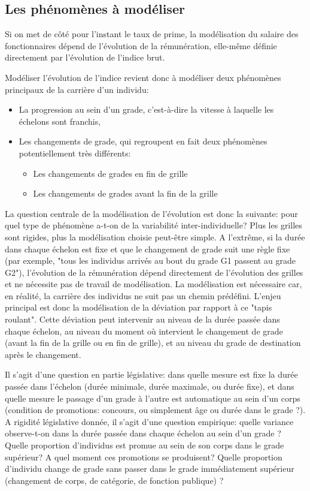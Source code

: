 \documentclass[11pt,a4paper]{article}
\begin{document}
\subsection*{Les phénomènes à modéliser}

Si on met de côté pour l'instant le taux de prime, la modélisation du salaire des fonctionnaires dépend de l'évolution de la rémunération, elle-même définie directement par l'évolution de l'indice brut. 

Modéliser l'évolution de l'indice revient donc à modéliser deux phénomènes principaux de la carrière d'un individu: 
\begin{itemize}[leftmargin=1cm ,parsep=0cm,itemsep=0cm,topsep=0cm] 
\item La progression au sein d'un grade, c'est-à-dire la vitesse à laquelle les échelons sont franchis,
\item Les changements de grade, qui regroupent en fait deux phénomènes potentiellement très différents: 
	\begin{itemize}[leftmargin=1cm ,parsep=0cm,itemsep=0cm,topsep=0cm] 
	\item Les changements de grades en fin de grille
	\item Les changements de grades avant la fin de la grille
	\end{itemize}
\end{itemize} 

\vspace{0.2cm}


La question centrale de la modélisation de l'évolution est donc la suivante: pour quel type de phénomène a-t-on de la variabilité inter-individuelle? Plus les grilles sont rigides, plus la modélisation choisie peut-être simple. A l'extrême, si la durée dans chaque échelon est fixe et que le changement de grade suit une règle fixe (par exemple, "tous les individus arrivés au bout du grade G1 passent au grade G2"), l'évolution de la rémunération dépend directement de l'évolution des grilles et ne nécessite pas de travail de modélisation. La modélisation est nécessaire car, en réalité, la carrière des individus ne suit pas un chemin prédéfini. L'enjeu principal est donc la modélisation de la déviation par rapport à ce "tapis roulant". Cette déviation peut intervenir au niveau de la durée passée dans chaque échelon, au niveau du moment où intervient le changement de grade (avant la fin de la grille ou en fin de grille), et au niveau du grade de destination après le changement. 

Il s'agit d'une question en partie législative: dans quelle mesure est fixe la durée passée dans l'échelon (durée minimale, durée maximale, ou durée fixe), et dans quelle mesure le passage d'un grade à l'autre est automatique au sein d'un corps (condition de promotions: concours, ou simplement âge ou durée dans le grade ?). A rigidité législative donnée, il s'agit d'une question empirique: quelle variance observe-t-on dans la durée passée dans chaque échelon au sein d'un grade ? Quelle proportion d'individus est promue au sein de son corps dans le grade supérieur? A quel moment ces promotions se produisent? Quelle proportion d'individu change de grade sans passer dans le grade immédiatement supérieur (changement de corps, de catégorie, de fonction publique) ?
\end{document}
